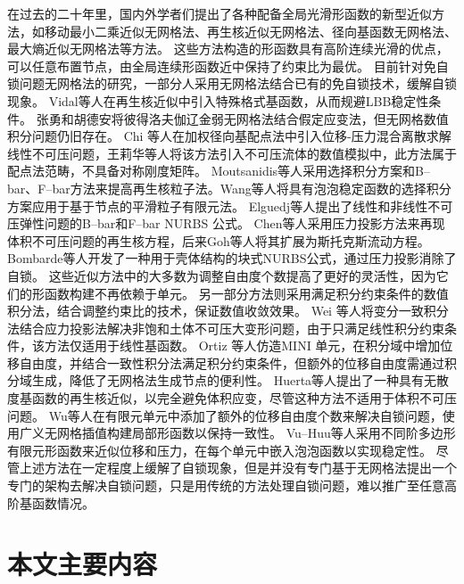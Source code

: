 在过去的二十年里，国内外学者们提出了各种配备全局光滑形函数的新型近似方法，如移动最小二乘近似无网格法\cite{Belytschko1994}、再生核近似无网格法\cite{liu1995}、径向基函数无网格法\cite{chi2014,wang2020d}、最大熵近似无网格法\cite{ortiz-bernardin2015}等方法。
这些方法构造的形函数具有高阶连续光滑的优点，可以任意布置节点，由全局连续形函数近中保持了约束比为最优。
目前针对免自锁问题无网格法的研究，一部分人采用无网格法结合已有的免自锁技术，缓解自锁现象。
Vidal等人\cite{Vidal2002}在再生核近似中引入特殊格式基函数，从而规避LBB稳定性条件。
张勇和胡德安\cite{zhang2008}将彼得洛夫伽辽金弱无网格法结合假定应变法，但无网格数值积分问题仍旧存在。
Chi 等人\cite{chi2014}在加权径向基配点法中引入位移-压力混合离散求解线性不可压问题，王莉华等人\cite{Wang2020}将该方法引入不可压流体的数值模拟中，此方法属于配点法范畴，不具备对称刚度矩阵。
Moutsanidis等人\cite{moutsanidis2020,moutsanidis2021}采用选择积分方案和B--bar、F--bar方法来提高再生核粒子法。Wang等人\cite{wang2022c}将具有泡泡稳定函数的选择积分方案应用于基于节点的平滑粒子有限元法。
Elguedj等人\cite{elguedj2008}提出了线性和非线性不可压弹性问题的B--bar和F--bar NURBS 公式。
Chen等人\cite{chen2000}采用压力投影方法来再现体积不可压问题的再生核方程，后来Goh等人\cite{goh2018}将其扩展为斯托克斯流动方程。
Bombarde等人\cite{bombarde2022}开发了一种用于壳体结构的块式NURBS公式，通过压力投影消除了自锁。
这些近似方法中的大多数为调整自由度个数提高了更好的灵活性，因为它们的形函数构建不再依赖于单元。
另一部分方法则采用满足积分约束条件的数值积分法，结合调整约束比的技术，保证数值收敛效果。
Wei 等人\cite{Wei2020}将变分一致积分法结合应力投影法解决非饱和土体不可压大变形问题，由于只满足线性积分约束条件，该方法仅适用于线性基函数。
Ortiz 等人\cite{Ortiz2015}仿造MINI 单元，在积分域中增加位移自由度，并结合一致性积分法满足积分约束条件，但额外的位移自由度需通过积分域生成，降低了无网格法生成节点的便利性。
Huerta等人\cite{huerta2004a}提出了一种具有无散度基函数的再生核近似，以完全避免体积应变，尽管这种方法不适用于体积不可压问题。
Wu等人\cite{wu2012}在有限元单元中添加了额外的位移自由度个数来解决自锁问题，使用广义无网格插值构建局部形函数以保持一致性。
Vu--Huu等人\cite{vu-huu2019}采用不同阶多边形有限元形函数来近似位移和压力，在每个单元中嵌入泡泡函数以实现稳定性。
尽管上述方法在一定程度上缓解了自锁现象，但是并没有专门基于无网格法提出一个专门的架构去解决自锁问题，只是用传统的方法处理自锁问题，难以推广至任意高阶基函数情况。

\section{本文主要内容}

